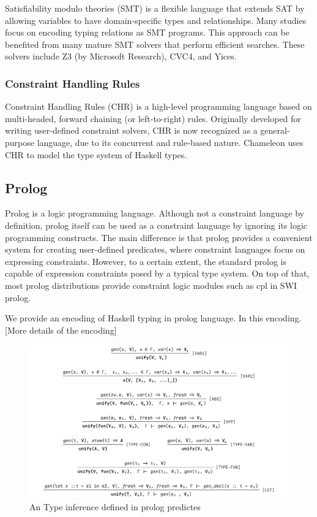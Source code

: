 Satisfiability modulo theories (SMT) is a flexible language that extends SAT by allowing variables to have domain-specific types and relationships. Many studies focus on encoding typing relations as SMT programs. This approach can be benefited from many mature SMT solvers that perform efficient searches. These solvers include Z3 (by Microsoft Research), CVC4, and Yices.

\subsubsection{Constraint Handling Rules}
Constraint Handling Rules (CHR) is a high-level programming language based on multi-headed, forward chaining (or left-to-right) rules. Originally developed for writing user-defined constraint solvers, CHR is now recognized as a general-purpose language, due to its concurrent and rule-based nature. Chameleon uses CHR to model the type system of Haskell types.

\subsection{Prolog}
Prolog is a logic programming language. Although not a constraint language by definition, prolog itself can be used as a constraint language by ignoring its logic programming constructs. The main difference is that prolog provides a convenient system for creating user-defined predicates, where constraint languages focus on expressing constraints. However, to a certain extent, the standard prolog is capable of expression constraints posed by a typical type system. On top of that, most prolog distributions provide constraint logic modules such as cpl in SWI prolog.


We provide an encoding of Haskell typing in prolog language. In this encoding. [More details of the encoding]


\begin{figure}
  \includegraphics[width=\linewidth]{Prolog}
  \caption{An Type inference defined in prolog predictes}
\end{figure}
  
